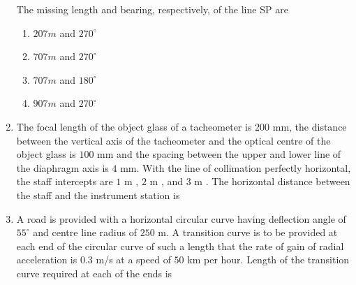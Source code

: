 \documentclass[journal]{IEEEtran}
\begin{document}
\begin{enumerate}
\vspace{0.5cm}

The missing length and bearing, respectively, of the line SP are \hfill {}

\begin{enumerate}
\item $207 m$ and $270^\circ$
\item $707 m$ and $270^\circ$
\item $707 m$ and $180^\circ$
\item $907 m$ and $270^\circ$
\end{enumerate}

\item The focal length of the object glass of a tacheometer is $200$ mm, the distance between the vertical axis of the tacheometer and the optical centre of the object glass is $100$ mm and the spacing between the upper and lower line of the diaphragm axis is $4$ mm. With the line of collimation perfectly horizontal, the staff intercepts are $1$ m , $2$ m , and $3$ m . The horizontal distance  between the staff and the instrument station is \hfill {}
\begin{enumerate}
\end{enumerate}

\item A road is provided with a horizontal circular curve having deflection angle of $55^\circ$ and centre line radius of $250$ m. A transition curve is to be provided at each end of the circular curve of such a length that the rate of gain of radial acceleration is $0.3$ m/s at a speed of $50$ km per hour. Length of the transition curve required at each of the ends is \hfill {}
\begin{enumerate}
\end{enumerate}


\end{enumerate}
\end{document}
